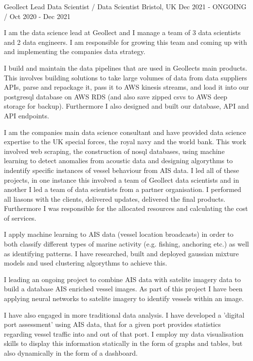 \begin{cventries}
  \cventry
    {Geollect}
    {Lead Data Scientist / Data Scientist}
    {Bristol, UK}
    {Dec 2021 - ONGOING / Oct 2020 - Dec 2021}
    {
      \begin{cvitems}
        \item {I am the data science lead at Geollect and I manage a team of 3 data scientists and 2 data engineers. I am responsible for growing this team and coming up with and implementing the companies data strategy.}
        \item {I build and maintain the data pipelines that are used in Geollects main products. This involves building solutions to take large volumes of data from data suppliers APIs, parse and repackage it, pass it to AWS kinesis streams, and load it into our postgresql database on AWS RDS (and also save zipped csvs to AWS deep storage for backup). Furthermore I also designed and built our database, API and API endpoints.}
        \item {I am the companies main data science consultant and have provided data science expertise to the UK special forces, the royal navy and the world bank. This work involved web scraping, the construction of nosql databases, using machine learning to detect anomalies from acoustic data and designing algorythms to indentify specific instances of vessel behaviour from AIS data. I led all of these projects, in one instance this involved a team of Geollect data scientists and in another I led a team of data scientists from a partner organisation. I performed all liasons with the clients, delivered updates, delivered the final products. Furthermore I was responsible for the allocated resources and calculating the cost of services.}
        \item {I apply machine learning to AIS data (vessel location broadcasts) in order to both classify different types of marine activity (e.g. fishing, anchoring etc.) as well as identifying patterns. I have researched, built and deployed gaussian mixture models and used clustering algorythms to achieve this.}
        \item {I leading an ongoing project to combine AIS data with satelite imagery data to build a database AIS enriched vessel images. As part of this project I have been applying neural networks to satelite imagery to identify vessels within an image.}
        \item {I have also engaged in more traditional data analysis. I have developed a 'digital port assessment' using AIS data, that for a given port provides statistics regarding vessel traffic into and out of that port. I employ my data visualisation skills to display this information statically in the form of graphs and tables, but also dynamically in the form of a dashboard.}

\end{cvitems}}
\end{cventries}
